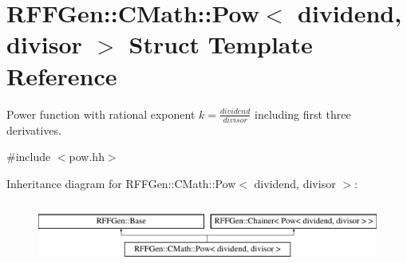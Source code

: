 \hypertarget{structRFFGen_1_1CMath_1_1Pow}{\section{R\-F\-F\-Gen\-:\-:C\-Math\-:\-:Pow$<$ dividend, divisor $>$ Struct Template Reference}
\label{structRFFGen_1_1CMath_1_1Pow}
}


Power function with rational exponent $ k = \frac{dividend}{divisor} $ including first three derivatives.  




{\ttfamily \#include $<$pow.\-hh$>$}

Inheritance diagram for R\-F\-F\-Gen\-:\-:C\-Math\-:\-:Pow$<$ dividend, divisor $>$\-:\begin{figure}[H]
\begin{center}
\leavevmode
\includegraphics[height=1.964912cm]{structRFFGen_1_1CMath_1_1Pow}
\end{center}
\end{figure}
